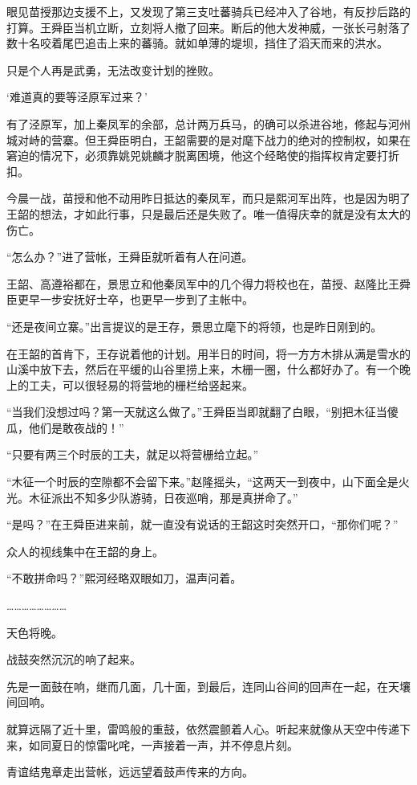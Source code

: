 眼见苗授那边支援不上，又发现了第三支吐蕃骑兵已经冲入了谷地，有反抄后路的打算。王舜臣当机立断，立刻将人撤了回来。断后的他大发神威，一张长弓射落了数十名咬着尾巴追击上来的蕃骑。就如单薄的堤坝，挡住了滔天而来的洪水。

只是个人再是武勇，无法改变计划的挫败。

‘难道真的要等泾原军过来？’

有了泾原军，加上秦凤军的余部，总计两万兵马，的确可以杀进谷地，修起与河州城对峙的营寨。但王舜臣明白，王韶需要的是对麾下战力的绝对的控制权，如果在窘迫的情况下，必须靠姚兕姚麟才脱离困境，他这个经略使的指挥权肯定要打折扣。

今晨一战，苗授和他不动用昨日抵达的秦凤军，而只是熙河军出阵，也是因为明了王韶的想法，才如此行事，只是最后还是失败了。唯一值得庆幸的就是没有太大的伤亡。

“怎么办？”进了营帐，王舜臣就听着有人在问道。

王韶、高遵裕都在，景思立和他秦凤军中的几个得力将校也在，苗授、赵隆比王舜臣更早一步安抚好士卒，也更早一步到了主帐中。

“还是夜间立寨。”出言提议的是王存，景思立麾下的将领，也是昨日刚到的。

在王韶的首肯下，王存说着他的计划。用半日的时间，将一方方木排从满是雪水的山溪中放下去，然后在平缓的山谷里捞上来，木栅一圈，什么都好办了。有一个晚上的工夫，可以很轻易的将营地的栅栏给竖起来。

“当我们没想过吗？第一天就这么做了。”王舜臣当即就翻了白眼，“别把木征当傻瓜，他们是敢夜战的！”

“只要有两三个时辰的工夫，就足以将营栅给立起。”

“木征一个时辰的空隙都不会留下来。”赵隆摇头，“这两天一到夜中，山下面全是火光。木征派出不知多少队游骑，日夜巡哨，那是真拼命了。”

“是吗？”在王舜臣进来前，就一直没有说话的王韶这时突然开口，“那你们呢？”

众人的视线集中在王韶的身上。

“不敢拼命吗？”熙河经略双眼如刀，温声问着。

……………………

天色将晚。

战鼓突然沉沉的响了起来。

先是一面鼓在响，继而几面，几十面，到最后，连同山谷间的回声在一起，在天壤间回响。

就算远隔了近十里，雷鸣般的重鼓，依然震颤着人心。听起来就像从天空中传递下来，如同夏日的惊雷叱咤，一声接着一声，并不停息片刻。

青谊结鬼章走出营帐，远远望着鼓声传来的方向。

